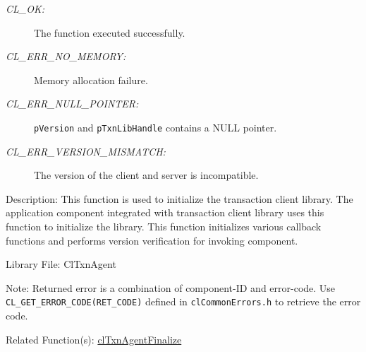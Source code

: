 \begin{flushleft}
\begin{Desc}
\begin{description}
\item[{\em CL\_\-OK:}]The function executed successfully. 
\item[{\em CL\_\-ERR\_\-NO\_\-MEMORY:}]Memory allocation failure. 
\item[{\em CL\_\-ERR\_\-NULL\_\-POINTER:}]{\tt{pVersion}} and {\tt{pTxnLibHandle}} contains a NULL pointer.
\item[{\em CL\_\-ERR\_\-VERSION\_\-MISMATCH:}] The version of the client and server is incompatible.
\end{description}
\end{Desc}
\begin{Desc}
\item[Description:]
This function is used to initialize the transaction client library.
 The application component integrated with transaction client library
 uses this function to initialize the library. This function initializes
  various callback functions and performs version verification for
  invoking component.\end{Desc}
\begin{Desc}
\item[Library File:]Cl\-Txn\-Agent\end{Desc}
\begin{Desc}
\item[Note:]
Returned error is a combination of component-ID and error-code.
 Use {\tt{CL\_\-GET\_\-ERROR\_\-CODE(RET\_\-CODE)}} defined in {\tt{clCommonErrors.h}} to
 retrieve the error code.
\end{Desc}
\begin{Desc}
\item[Related Function(s):]\hyperlink{pagetxn202}{cl\-Txn\-Agent\-Finalize} \end{Desc}
\newpage



\end{flushleft}
